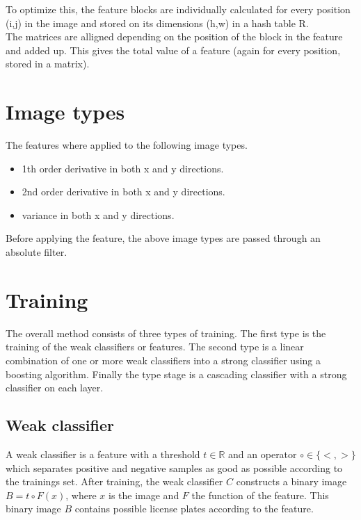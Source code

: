 \documentclass[a4paper,11pt]{article}
\begin{document}
	To optimize this, the feature blocks are individually calculated for every
	position (i,j) in the image and stored on its dimensions (h,w) in a hash
	table R.\\
	The matrices are alligned depending on the position of the block in the
	feature and added up. This gives the total value of a feature (again for
	every position, stored in a matrix).

	\section*{Image types}
	The features where applied to the following image types.
	\begin{itemize}
		\item{1th order derivative in both x and y directions.}
		\item{2nd order derivative in both x and y directions.}
		\item{variance in both x and y directions.}
	\end{itemize}
	Before applying the feature, the above image types are passed through an
	absolute filter.


\section*{Training}
The overall method consists of three types of training. The first type is the
training of the weak classifiers or features. The second type is a linear
combination of one or more weak classifiers into a strong classifier using a
boosting algorithm. Finally the type stage is a cascading classifier with a
strong classifier on each layer.

\subsection*{Weak classifier}
A weak classifier is a feature with a threshold $t \in \mathbb{R}$ and an
operator $\circ \in \{<, >\}$ which separates positive and negative samples as
good as possible according to the trainings set. After training, the weak
classifier $C$ constructs a binary image $B = t \circ F(x)$, where $x$ is the
image and $F$ the function of the feature. This binary image $B$ contains
possible license plates according to the feature.
\end{document}
